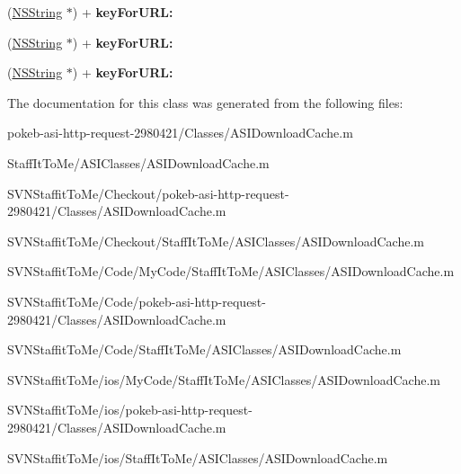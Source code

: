 \begin{DoxyCompactItemize}
\item 
\hypertarget{interface_a_s_i_download_cache_07_08_ac8ef88dda7459ccd227e388c126d8f3b}{
(\hyperlink{class_n_s_string}{\-N\-S\-String} $\ast$) + {\bfseries key\-For\-U\-R\-L\-:}}
\label{interface_a_s_i_download_cache_07_08_ac8ef88dda7459ccd227e388c126d8f3b}

\item 
\hypertarget{interface_a_s_i_download_cache_07_08_ac8ef88dda7459ccd227e388c126d8f3b}{
(\hyperlink{class_n_s_string}{\-N\-S\-String} $\ast$) + {\bfseries key\-For\-U\-R\-L\-:}}
\label{interface_a_s_i_download_cache_07_08_ac8ef88dda7459ccd227e388c126d8f3b}

\item 
\hypertarget{interface_a_s_i_download_cache_07_08_ac8ef88dda7459ccd227e388c126d8f3b}{
(\hyperlink{class_n_s_string}{\-N\-S\-String} $\ast$) + {\bfseries key\-For\-U\-R\-L\-:}}
\label{interface_a_s_i_download_cache_07_08_ac8ef88dda7459ccd227e388c126d8f3b}

\end{DoxyCompactItemize}


\-The documentation for this class was generated from the following files\-:\begin{DoxyCompactItemize}
\item 
pokeb-\/asi-\/http-\/request-\/2980421/\-Classes/\-A\-S\-I\-Download\-Cache.\-m\item 
\-Staff\-It\-To\-Me/\-A\-S\-I\-Classes/\-A\-S\-I\-Download\-Cache.\-m\item 
\-S\-V\-N\-Staffit\-To\-Me/\-Checkout/pokeb-\/asi-\/http-\/request-\/2980421/\-Classes/\-A\-S\-I\-Download\-Cache.\-m\item 
\-S\-V\-N\-Staffit\-To\-Me/\-Checkout/\-Staff\-It\-To\-Me/\-A\-S\-I\-Classes/\-A\-S\-I\-Download\-Cache.\-m\item 
\-S\-V\-N\-Staffit\-To\-Me/\-Code/\-My\-Code/\-Staff\-It\-To\-Me/\-A\-S\-I\-Classes/\-A\-S\-I\-Download\-Cache.\-m\item 
\-S\-V\-N\-Staffit\-To\-Me/\-Code/pokeb-\/asi-\/http-\/request-\/2980421/\-Classes/\-A\-S\-I\-Download\-Cache.\-m\item 
\-S\-V\-N\-Staffit\-To\-Me/\-Code/\-Staff\-It\-To\-Me/\-A\-S\-I\-Classes/\-A\-S\-I\-Download\-Cache.\-m\item 
\-S\-V\-N\-Staffit\-To\-Me/ios/\-My\-Code/\-Staff\-It\-To\-Me/\-A\-S\-I\-Classes/\-A\-S\-I\-Download\-Cache.\-m\item 
\-S\-V\-N\-Staffit\-To\-Me/ios/pokeb-\/asi-\/http-\/request-\/2980421/\-Classes/\-A\-S\-I\-Download\-Cache.\-m\item 
\-S\-V\-N\-Staffit\-To\-Me/ios/\-Staff\-It\-To\-Me/\-A\-S\-I\-Classes/\-A\-S\-I\-Download\-Cache.\-m\end{DoxyCompactItemize}
